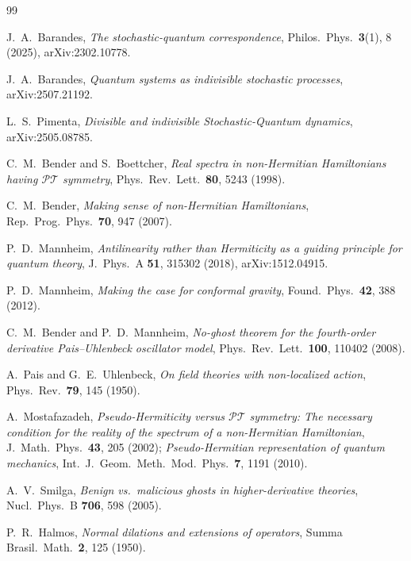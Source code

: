 \documentclass[11pt]{article}
\theoremstyle{definition}
\theoremstyle{remark}
\newcommand{\PT}{\mathcal{PT}}
\begin{document}
\begin{thebibliography}{99}

J.~A.~Barandes,
\emph{The stochastic-quantum correspondence},
Philos.\ Phys.\ \textbf{3}(1), 8 (2025), arXiv:2302.10778.

J.~A.~Barandes,
\emph{Quantum systems as indivisible stochastic processes},
arXiv:2507.21192.

L.~S.~Pimenta,
\emph{Divisible and indivisible Stochastic-Quantum dynamics},
arXiv:2505.08785.

C.~M.~Bender and S.~Boettcher,
\emph{Real spectra in non-Hermitian Hamiltonians having $\PT$ symmetry},
Phys.\ Rev.\ Lett.\ \textbf{80}, 5243 (1998).

C.~M.~Bender,
\emph{Making sense of non-Hermitian Hamiltonians},
Rep.\ Prog.\ Phys.\ \textbf{70}, 947 (2007).

P.~D.~Mannheim,
\emph{Antilinearity rather than Hermiticity as a guiding principle for
quantum theory},
J.\ Phys.\ A \textbf{51}, 315302 (2018), arXiv:1512.04915.

P.~D.~Mannheim,
\emph{Making the case for conformal gravity},
Found.\ Phys.\ \textbf{42}, 388 (2012).

C.~M.~Bender and P.~D.~Mannheim,
\emph{No-ghost theorem for the fourth-order derivative Pais--Uhlenbeck
oscillator model},
Phys.\ Rev.\ Lett.\ \textbf{100}, 110402 (2008).

A.~Pais and G.~E.~Uhlenbeck,
\emph{On field theories with non-localized action},
Phys.\ Rev.\ \textbf{79}, 145 (1950).

A.~Mostafazadeh,
\emph{Pseudo-Hermiticity versus $\PT$ symmetry: The necessary
condition for the reality of the spectrum of a non-Hermitian
Hamiltonian},
J.\ Math.\ Phys.\ \textbf{43}, 205 (2002);
\emph{Pseudo-Hermitian representation of quantum mechanics},
Int.\ J.\ Geom.\ Meth.\ Mod.\ Phys.\ \textbf{7}, 1191 (2010).

A.~V.~Smilga,
\emph{Benign vs.\ malicious ghosts in higher-derivative theories},
Nucl.\ Phys.\ B \textbf{706}, 598 (2005).

P.~R.~Halmos,
\emph{Normal dilations and extensions of operators},
Summa Brasil.\ Math.\ \textbf{2}, 125 (1950).


\end{thebibliography}
\end{document}

